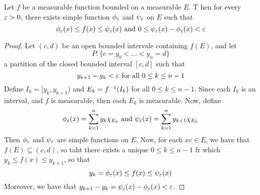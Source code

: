 \begin{lemma}\label{9.2.4}
    Let $f$ be a measurable function bounded on a measurable $E$. T hen for
    every $\varepsilon>0$, there exists simple function $\phi_\varepsilon$ and $\psi_\varepsilon$ on  $E$
    such that
    \begin{equation*}
        \phi_\varepsilon(x) \leq f(x) \leq \psi_\varepsilon(x) \text{ and }
        0 \leq \psi_\varepsilon(x)-\phi_\varepsilon(x)<\varepsilon
    \end{equation*}
\end{lemma}
\begin{proof}
    Let $(c,d)$ be an open bounded intervale containing $f(E)$, and let
    \begin{equation*}
        P:\{c=y_0< \dots < y_n=d\}
    \end{equation*}
    a partition of the closed bounded interval $[c,d]$ such that
    \begin{equation*}
        y_{k+1}-y_k<\varepsilon \text{ for all } 0 \leq k \leq n-1
    \end{equation*}
    Define $I_k=[y_k,y_{k+1})$ and $E_k=f^{-1}(I_k)$ for all $0 \leq k \leq
    n-1$. Since each $I_k$ is an interval, and $f$ is measurable, then each
    $E_k$ is measurable. Now, define
    \begin{equation*}
        \phi_\varepsilon(x)=\sum_{k=1}^n{y_k\chi_{E_k}} \text{ and }
        \psi_\varepsilon(x)=\sum_{k=1}^n{y_{k+1}\chi_{E_k}}
    \end{equation*}
    Then $\phi_\varepsilon$ and $\psi_\varepsilon$ are simple functions on  $E$. Now, for each $xc
    \in E$, we have that  $f(E) \subseteq (c,d)$, so taht there exists a unique
    $0 \leq k \leq n-1$ fr which $y_k \leq f(x) \leq y_{k+1}$, so that
    \begin{equation*}
        y_k=\phi_\varepsilon(x) \leq f(x) \leq \psi_\varepsilon(x)
    \end{equation*}
    Moreover, we have that $y_{k+1}-y_k=\psi_\varepsilon(x)-\phi_\varepsilon(x)<\varepsilon$.
\end{proof}

